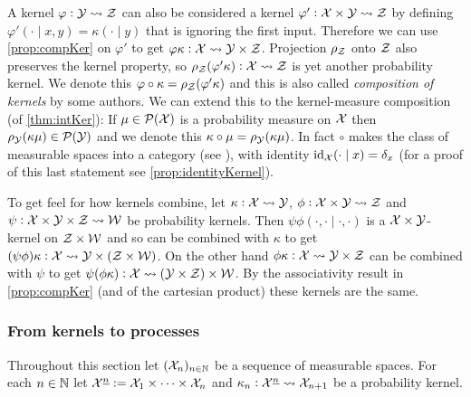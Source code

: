 \begin{rem}
  A kernel $\varphi:\mathcal{Y} \leadsto \mathcal{Z}$
  can also be considered a kernel
  $\varphi' : \mathcal{X} \times \mathcal{Y} \leadsto \mathcal{Z}$
  by defining
  $\varphi'(\cdot \mid x, y) = \kappa(\cdot \mid y)$
  that is ignoring the first input.
  Therefore we can use \cref{prop:compKer} on $\varphi'$ to get
  $\varphi \kappa : \mathcal{X} \leadsto \mathcal{Y} \times \mathcal{Z}$.
  Projection $\rho_\mathcal{Z}$ onto $\mathcal{Z}$ also preserves the kernel property,
  so $\rho_\mathcal{Z}(\varphi' \kappa) : \mathcal{X} \leadsto \mathcal{Z}$ is
  yet another probability kernel.
  We denote this $\varphi \circ \kappa = \rho_\mathcal{Z}(\varphi' \kappa)$
  and this is also called \emph{composition of kernels} by some authors.
  We can extend this to the kernel-measure composition (of \cref{thm:intKer}):
  If $\mu \in \mathcal{P}(\mathcal{X})$ is a probability measure on $\mathcal{X}$ then
  $\rho_\mathcal{Y}(\kappa \mu) \in \mathcal{P}(\mathcal{Y})$ and we denote this
  $\kappa \circ \mu = \rho_\mathcal{Y}(\kappa \mu)$.
  In fact $\circ$ makes the class of measurable spaces
  into a category (see ),
  with identity $\text{id}_{\mathcal{X}}(\cdot \mid x) = \delta_x$
  (for a proof of this last statement see \cref{prop:identityKernel}).
  \label{rem:altComp}
\end{rem}

\begin{example}
  To get feel for how kernels combine, let $\kappa: \mathcal{X} \leadsto \mathcal{Y}$,
  $\phi : \mathcal{X} \times \mathcal{Y} \leadsto \mathcal{Z}$ and
  $\psi : \mathcal{X} \times \mathcal{Y} \times \mathcal{Z} \leadsto \mathcal{W}$
  be probability kernels.
  Then $\psi \phi(\cdot , \cdot \mid \cdot, \cdot)$
  is a $\mathcal{X} \times \mathcal{Y}$-kernel on $\mathcal{Z} \times \mathcal{W}$
  and so can be combined with $\kappa$ to get
  $(\psi \phi) \kappa : \mathcal{X} \leadsto \mathcal{Y} \times (\mathcal{Z} \times \mathcal{W})$.
  On the other hand $\phi \kappa : \mathcal{X} \leadsto \mathcal{Y} \times \mathcal{Z}$
  can be combined with $\psi$ to get
  $\psi (\phi \kappa) : \mathcal{X} \leadsto (\mathcal{Y} \times \mathcal{Z}) \times \mathcal{W}$.
  By the associativity result in \cref{prop:compKer}
  (and of the cartesian product) these kernels are the same.
\end{example}

\subsubsection{From kernels to processes}

Throughout this section let $(\mathcal{X}_n)_{n \in \mathbb{N}}$ be a sequence
of measurable spaces. For each $n \in \mathbb{N}$ let
$\mathcal{X}^{\underline{n}} \vcentcolon= \mathcal{X}_1 \times \dots \times \mathcal{X}_n$ and
$\kappa_n : \mathcal{X}^{\underline{n}} \leadsto \mathcal{X}_{n+1}$ be a probability kernel.

